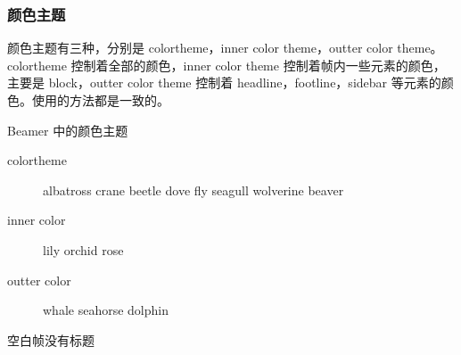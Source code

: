 \begin{frame}
    \frametitle{颜色主题}
    颜色主题有三种，分别是 colortheme，inner color theme，outter color theme。 colortheme 控制着全部的颜色，inner color theme 控制着帧内一些元素的颜色，主要是 block，outter color theme 控制着 headline，footline，sidebar 等元素的颜色。使用的方法都是一致的。
    \begin{exampleblock}{Beamer 中的颜色主题}
        \begin{description}
            \item[colortheme] albatross crane beetle dove fly seagull wolverine beaver
            \item[inner color] lily orchid rose
            \item[outter color] whale seahorse dolphin
        \end{description}
    \end{exampleblock}
\end{frame}

\begin{frame}[plain]
    空白帧没有标题
\end{frame}